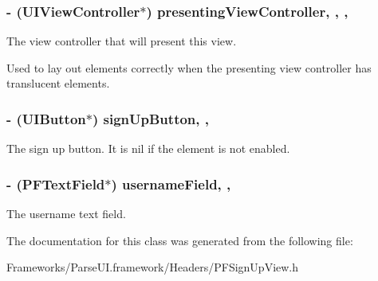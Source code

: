 \subsubsection[{presenting\+View\+Controller}]{\setlength{\rightskip}{0pt plus 5cm}-\/ (U\+I\+View\+Controller$\ast$) presenting\+View\+Controller\hspace{0.3cm}{\ttfamily [read]}, {\ttfamily [write]}, {\ttfamily [nonatomic]}, {\ttfamily [weak]}}\label{interface_p_f_sign_up_view_a48e4f5a10409de79d5a3e3bc18de0213}
The view controller that will present this view.

Used to lay out elements correctly when the presenting view controller has translucent elements. \hypertarget{interface_p_f_sign_up_view_ae319a64a63e1cc268b3a09263783b6f7}{}
\subsubsection[{sign\+Up\+Button}]{\setlength{\rightskip}{0pt plus 5cm}-\/ (U\+I\+Button$\ast$) sign\+Up\+Button\hspace{0.3cm}{\ttfamily [read]}, {\ttfamily [nonatomic]}, {\ttfamily [strong]}}\label{interface_p_f_sign_up_view_ae319a64a63e1cc268b3a09263783b6f7}
The sign up button. It is {\ttfamily nil} if the element is not enabled. \hypertarget{interface_p_f_sign_up_view_a87cd8eb60bc9201825a00f98630736f3}{}
\subsubsection[{username\+Field}]{\setlength{\rightskip}{0pt plus 5cm}-\/ ({\bf P\+F\+Text\+Field}$\ast$) username\+Field\hspace{0.3cm}{\ttfamily [read]}, {\ttfamily [nonatomic]}, {\ttfamily [strong]}}\label{interface_p_f_sign_up_view_a87cd8eb60bc9201825a00f98630736f3}
The username text field. 

The documentation for this class was generated from the following file\+:\begin{DoxyCompactItemize}
\item 
Frameworks/\+Parse\+U\+I.\+framework/\+Headers/P\+F\+Sign\+Up\+View.\+h\end{DoxyCompactItemize}
